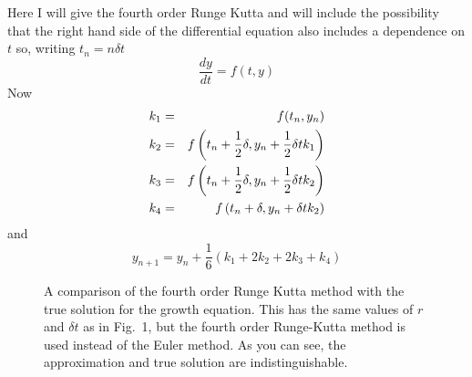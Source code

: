 \documentclass[12pt]{article}
\begin{document}
Here I will give the fourth order Runge Kutta and will include the
possibility that the right hand side of the differential equation also
includes a dependence on $t$ so, writing $t_n=n\delta t$
\begin{equation}
\frac{dy}{dt}=f(t,y)
\end{equation}
Now
\begin{eqnarray}
k_1&=&f(t_n,y_n)\cr
k_2&=&f\left(t_n+\frac{1}{2}\delta,y_n+\frac{1}{2}\delta tk_1\right)\cr 
k_3&=&f\left(t_n+\frac{1}{2}\delta,y_n+\frac{1}{2}\delta tk_2\right)\cr 
k_4&=&f\left(t_n+\delta,y_n+\delta tk_2\right) 
\end{eqnarray}
and 
\begin{equation}
y_{n+1}=y_n+\frac{1}{6}(k_1+2k_2+2k_3+k_4)
\end{equation}

\begin{figure}
\begin{center}

\end{center}
\caption{A comparison of the fourth order Runge Kutta method with the
  true solution for the growth equation. This has the same values of
  $r$ and $\delta t$ as in Fig.~1, but the fourth order Runge-Kutta
  method is used instead of the Euler method. As you can see, the
  approximation and true solution are indistinguishable.}
\end{figure}
\end{document}

